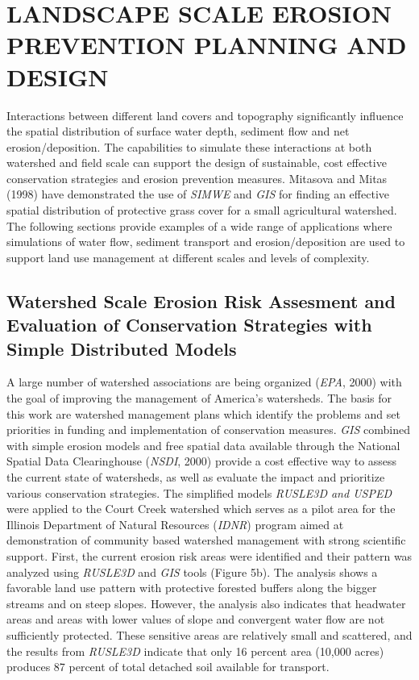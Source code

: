\documentclass{kapedbk} %
\begin{document}
\bigskip \noindent
\section{LANDSCAPE SCALE EROSION PREVENTION PLANNING AND DESIGN}

Interactions between different land covers and topography
significantly influence the spatial distribution of surface water depth,
sediment flow and net erosion/deposition. The capabilities to
simulate these interactions at both watershed and field scale
can support the design of sustainable, cost effective
conservation strategies and erosion prevention measures.
Mitasova and Mitas (1998) have demonstrated the use of {\sl SIMWE}
and {\sl GIS} for finding an effective spatial distribution of
protective grass cover for a small agricultural watershed.
The following sections provide examples of
a wide range of applications where simulations of water flow,
sediment transport and erosion/deposition are used
to support land use management at different scales
and levels of complexity.

\bigskip \medskip \noindent
\subsection{ Watershed Scale Erosion Risk Assesment and Evaluation of 
Conservation Strategies with Simple Distributed Models}

\medskip
A large number of watershed associations are being organized 
({\sl EPA}, 2000)
with the goal of improving the management of
America's watersheds. The basis for this work are
watershed management plans which identify the problems and
set priorities in funding and implementation of conservation measures.
{\sl GIS} combined with simple erosion models and free spatial data
available through the National Spatial Data Clearinghouse ({\sl NSDI}, 2000)
provide a cost effective way to assess
the current state of watersheds, as well as evaluate the impact and
prioritize various conservation strategies.
The simplified models {\sl RUSLE3D and USPED}
were applied to the Court Creek watershed which
serves as a pilot area for the Illinois Department of Natural
Resources ({\sl IDNR}) program aimed at demonstration of
community based watershed management with strong scientific support.
First, the current erosion risk areas were identified and their pattern
was analyzed using {\sl RUSLE3D} and {\sl GIS} tools (Figure 5b).
The analysis shows a favorable land use pattern
with protective forested buffers along the bigger streams and
on steep slopes. However, the analysis also indicates that
headwater areas and areas with lower values of slope and convergent water
flow are not sufficiently protected. These sensitive areas are relatively
small and scattered, and the results from {\sl RUSLE3D}
indicate that only 16 percent area (10,000 acres) produces
87 percent of total detached soil available for transport.
\end{document}
